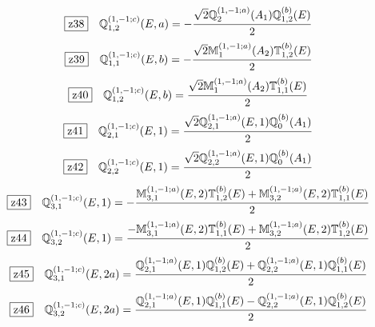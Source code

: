 \documentclass[fleqn,10pt,landscape]{jsarticle}
\begin{document}
\begin{dmath*}
\hspace*{3mm}\fbox{z38}\quad \mathbb{Q}_{1,2}^{(1,-1;c)}(E,a)=- \frac{\sqrt{2} \mathbb{Q}_{2}^{(1,-1;a)}(A_{1}) \mathbb{Q}_{1,2}^{(b)}(E)}{2}
\end{dmath*}
\begin{dmath*}
\hspace*{3mm}\fbox{z39}\quad \mathbb{Q}_{1,1}^{(1,-1;c)}(E,b)=- \frac{\sqrt{2} \mathbb{M}_{1}^{(1,-1;a)}(A_{2}) \mathbb{T}_{1,2}^{(b)}(E)}{2}
\end{dmath*}
\begin{dmath*}
\hspace*{3mm}\fbox{z40}\quad \mathbb{Q}_{1,2}^{(1,-1;c)}(E,b)=\frac{\sqrt{2} \mathbb{M}_{1}^{(1,-1;a)}(A_{2}) \mathbb{T}_{1,1}^{(b)}(E)}{2}
\end{dmath*}
\begin{dmath*}
\hspace*{3mm}\fbox{z41}\quad \mathbb{Q}_{2,1}^{(1,-1;c)}(E,1)=\frac{\sqrt{2} \mathbb{Q}_{2,1}^{(1,-1;a)}(E,1) \mathbb{Q}_{0}^{(b)}(A_{1})}{2}
\end{dmath*}
\begin{dmath*}
\hspace*{3mm}\fbox{z42}\quad \mathbb{Q}_{2,2}^{(1,-1;c)}(E,1)=\frac{\sqrt{2} \mathbb{Q}_{2,2}^{(1,-1;a)}(E,1) \mathbb{Q}_{0}^{(b)}(A_{1})}{2}
\end{dmath*}
\begin{dmath*}
\hspace*{3mm}\fbox{z43}\quad \mathbb{Q}_{3,1}^{(1,-1;c)}(E,1)=- \frac{\mathbb{M}_{3,1}^{(1,-1;a)}(E,2) \mathbb{T}_{1,2}^{(b)}(E) + \mathbb{M}_{3,2}^{(1,-1;a)}(E,2) \mathbb{T}_{1,1}^{(b)}(E)}{2}
\end{dmath*}
\begin{dmath*}
\hspace*{3mm}\fbox{z44}\quad \mathbb{Q}_{3,2}^{(1,-1;c)}(E,1)=\frac{- \mathbb{M}_{3,1}^{(1,-1;a)}(E,2) \mathbb{T}_{1,1}^{(b)}(E) + \mathbb{M}_{3,2}^{(1,-1;a)}(E,2) \mathbb{T}_{1,2}^{(b)}(E)}{2}
\end{dmath*}
\begin{dmath*}
\hspace*{3mm}\fbox{z45}\quad \mathbb{Q}_{3,1}^{(1,-1;c)}(E,2a)=\frac{\mathbb{Q}_{2,1}^{(1,-1;a)}(E,1) \mathbb{Q}_{1,2}^{(b)}(E) + \mathbb{Q}_{2,2}^{(1,-1;a)}(E,1) \mathbb{Q}_{1,1}^{(b)}(E)}{2}
\end{dmath*}
\begin{dmath*}
\hspace*{3mm}\fbox{z46}\quad \mathbb{Q}_{3,2}^{(1,-1;c)}(E,2a)=\frac{\mathbb{Q}_{2,1}^{(1,-1;a)}(E,1) \mathbb{Q}_{1,1}^{(b)}(E) - \mathbb{Q}_{2,2}^{(1,-1;a)}(E,1) \mathbb{Q}_{1,2}^{(b)}(E)}{2}
\end{dmath*}
\end{document}
